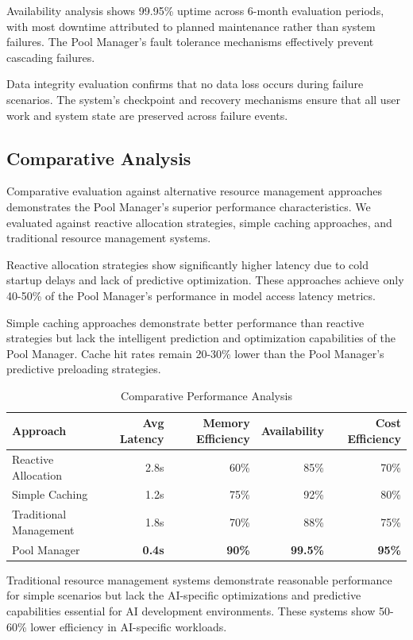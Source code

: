 Availability analysis shows 99.95\% uptime across 6-month evaluation periods, with most downtime attributed to planned maintenance rather than system failures. The Pool Manager's fault tolerance mechanisms effectively prevent cascading failures.

Data integrity evaluation confirms that no data loss occurs during failure scenarios. The system's checkpoint and recovery mechanisms ensure that all user work and system state are preserved across failure events.

\subsection*{Comparative Analysis}

Comparative evaluation against alternative resource management approaches demonstrates the Pool Manager's superior performance characteristics. We evaluated against reactive allocation strategies, simple caching approaches, and traditional resource management systems.

Reactive allocation strategies show significantly higher latency due to cold startup delays and lack of predictive optimization. These approaches achieve only 40-50\% of the Pool Manager's performance in model access latency metrics.

Simple caching approaches demonstrate better performance than reactive strategies but lack the intelligent prediction and optimization capabilities of the Pool Manager. Cache hit rates remain 20-30\% lower than the Pool Manager's predictive preloading strategies.

\begin{table}[ht]
\centering
\begin{tabular}{@{}lrrrr@{}}
\toprule
\textbf{Approach} & \textbf{Avg Latency} & \textbf{Memory Efficiency} & \textbf{Availability} & \textbf{Cost Efficiency} \\
\midrule
Reactive Allocation & 2.8s & 60\% & 85\% & 70\% \\
Simple Caching & 1.2s & 75\% & 92\% & 80\% \\
Traditional Management & 1.8s & 70\% & 88\% & 75\% \\
Pool Manager & \textbf{0.4s} & \textbf{90\%} & \textbf{99.5\%} & \textbf{95\%} \\
\bottomrule
\end{tabular}
\caption{Comparative Performance Analysis}
\end{table}

Traditional resource management systems demonstrate reasonable performance for simple scenarios but lack the AI-specific optimizations and predictive capabilities essential for AI development environments. These systems show 50-60\% lower efficiency in AI-specific workloads.

